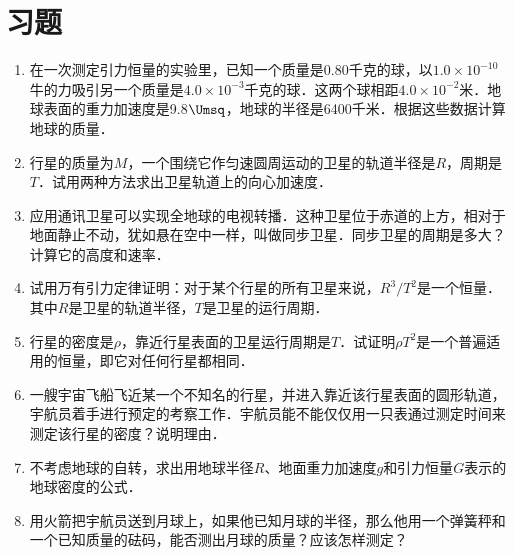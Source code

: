 \section*{习题}
\begin{enumerate}
	\item 在一次测定引力恒量的实验里，已知一个质量是0.80千克的球，以$1.0\times 10^{-10}$牛的力吸引另一个质量是$4.0\times 10^{-3}$千克的球．这两个球相距$4.0\times 10^{-2}$米．地球表面的重力加速度是9.8$\Umsq$，地球的半径是6400千米．根据这些数据计算地球的质量．
	\item 行星的质量为$M$，一个围绕它作匀速圆周运动的卫星的轨道半径是$R$，周期是$T$．试用两种方法求出卫星轨道上的向心加速度．	
	\item 应用通讯卫星可以实现全地球的电视转播．这种卫星位于赤道的上方，相对于地面静止不动，犹如悬在空中一样，叫做同步卫星．同步卫星的周期是多大？计算它的高度和速率．
	\item 试用万有引力定律证明：对于某个行星的所有卫星来说，$R^3/T^2$是一个恒量．其中$R$是卫星的轨道半径，$T$是卫星的运行周期．
	\item 行星的密度是$\rho$，靠近行星表面的卫星运行周期是$T$．试证明$\rho T^2$是一个普遍适用的恒量，即它对任何行星都相同．
	\item 一艘宇宙飞船飞近某一个不知名的行星，并进入靠近该行星表面的圆形轨道，宇航员着手进行预定的考察工作．宇航员能不能仅仅用一只表通过测定时间来测定该行星的密度？说明理由．
	\item 不考虑地球的自转，求出用地球半径$R$、地面重力加速度$g$和引力恒量$G$表示的地球密度的公式．
	\item 用火箭把宇航员送到月球上，如果他已知月球的半径，那么他用一个弹簧秤和一个已知质量的砝码，能否测出月球的质量？应该怎样测定？	


\end{enumerate}





